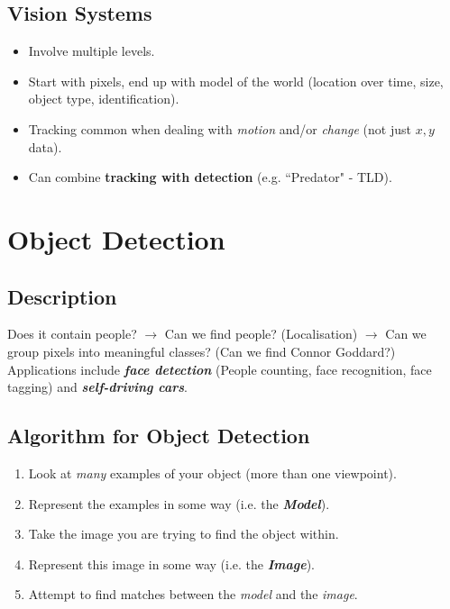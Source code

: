 \documentclass[english, 10pt]{article}
\begin{document}
\subsection{Vision Systems}

\begin{itemize}
\item Involve multiple levels.
\item Start with pixels, end up with model of the world (location over time, size, object type, identification).
\item Tracking common when dealing with \textit{motion} and/or \textit{change} (not just $x,y$ data).
\item Can combine \textbf{tracking with detection} (e.g. ``Predator" - TLD).
\end{itemize}

\section{Object Detection}

\subsection{Description}

Does it contain people? $\rightarrow$ Can we find people? (Localisation) $\rightarrow$ Can we group pixels into meaningful classes? (Can we find Connor Goddard?) \\

Applications include \textbf{\textit{face detection}} (People counting, face recognition, face tagging) and \textit{\textbf{self-driving cars}}.

\subsection{Algorithm for Object Detection}

\begin{enumerate}
\item Look at \textit{many} examples of your object (more than one viewpoint). 
\item Represent the examples in some way (i.e. the \textit{\textbf{Model}}).
\item Take the image you are trying to find the object within.
\item Represent this image in some way (i.e. the \textit{\textbf{Image}}).
\item Attempt to find matches between the \textit{model} and the \textit{image}.
\end{enumerate}
\end{document}
